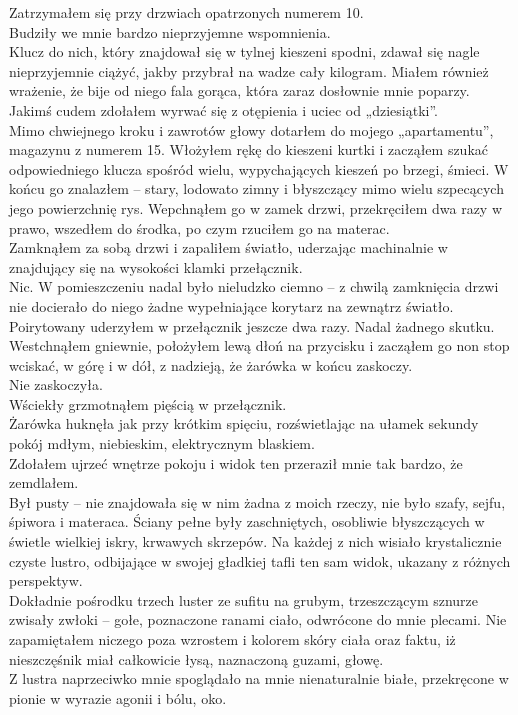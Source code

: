 \documentclass[../MAIN.tex]{subfiles}
\begin{document}
Zatrzymałem się przy drzwiach opatrzonych numerem 10.\\
Budziły we mnie bardzo nieprzyjemne wspomnienia.\\
Klucz do nich, który znajdował się w tylnej kieszeni spodni, zdawał się nagle nieprzyjemnie ciążyć, jakby przybrał na wadze cały kilogram. Miałem również wrażenie, że bije od niego fala gorąca, która zaraz dosłownie mnie poparzy.\\
Jakimś cudem zdołałem wyrwać się z otępienia i uciec od „dziesiątki”.\\
Mimo chwiejnego kroku i zawrotów głowy dotarłem do mojego „apartamentu”, magazynu z numerem 15. Włożyłem rękę do kieszeni kurtki i zacząłem szukać odpowiedniego klucza spośród wielu, wypychających kieszeń po brzegi, śmieci. W końcu go znalazłem -- stary, lodowato zimny i błyszczący mimo wielu szpecących jego powierzchnię rys. Wepchnąłem go w zamek drzwi, przekręciłem dwa razy w prawo, wszedłem do środka, po czym rzuciłem go na materac.\\
Zamknąłem za sobą drzwi i zapaliłem światło, uderzając machinalnie w znajdujący się na wysokości klamki przełącznik.\\
Nic. W pomieszczeniu nadal było nieludzko ciemno -- z chwilą zamknięcia drzwi nie docierało do niego żadne wypełniające korytarz na zewnątrz światło.\\
Poirytowany uderzyłem w przełącznik jeszcze dwa razy. Nadal żadnego skutku.\\
Westchnąłem gniewnie, położyłem lewą dłoń na przycisku i zacząłem go non stop wciskać, w górę i w dół, z nadzieją, że żarówka w końcu zaskoczy.\\
Nie zaskoczyła.\\
Wściekły grzmotnąłem pięścią w przełącznik.\\
Żarówka huknęła jak przy krótkim spięciu, rozświetlając na ułamek sekundy pokój mdłym, niebieskim, elektrycznym blaskiem.\\
Zdołałem ujrzeć wnętrze pokoju i widok ten przeraził mnie tak bardzo, że zemdlałem.\\
Był pusty -- nie znajdowała się w nim żadna z moich rzeczy, nie było szafy, sejfu, śpiwora i materaca. Ściany pełne były zaschniętych, osobliwie błyszczących w świetle wielkiej iskry, krwawych skrzepów. Na każdej z nich wisiało krystalicznie czyste lustro, odbijające w swojej gładkiej tafli ten sam widok, ukazany z różnych perspektyw.\\
Dokładnie pośrodku trzech luster ze sufitu na grubym, trzeszczącym sznurze zwisały zwłoki -- gołe, poznaczone ranami ciało, odwrócone do mnie plecami. Nie zapamiętałem niczego poza wzrostem i kolorem skóry ciała oraz faktu, iż nieszczęśnik miał całkowicie łysą, naznaczoną guzami, głowę.\\
Z lustra naprzeciwko mnie spoglądało na mnie nienaturalnie białe, przekręcone w pionie w wyrazie agonii i bólu, oko.
\end{document}
